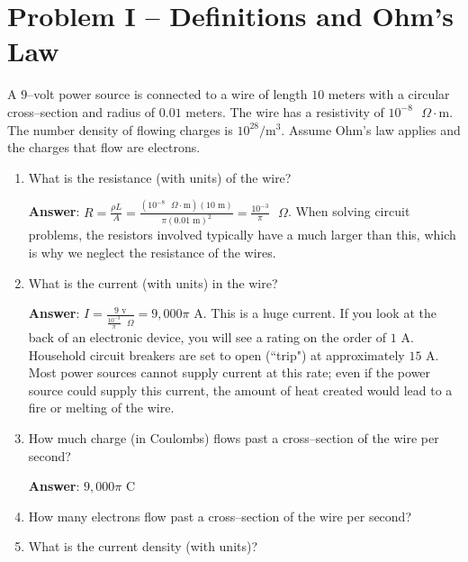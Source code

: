 \documentclass{article}
\newcommand{\ds}[0]{\displaystyle}
\begin{document}
\newpage

\section{Problem I -- Definitions and Ohm's Law}

A $9$--volt power source is connected to a wire of length $10$ meters with a circular cross--section and radius of $0.01$ meters. The wire has a resistivity of $10^{-8}\text{ }\Omega\cdot\text{m}$. The number density of flowing charges is $10^{28}/\text{m}^3$. Assume Ohm's law applies and the charges that flow are electrons.

\begin{enumerate}

  \item What is the resistance (with units) of the wire?

        \ifsolutions
        \textbf{Answer}: $\ds R=\frac{\rho L}{A} = \frac{(10^{-8}\text{ }\Omega\cdot\text{m})(10\text{ m})}{\pi (0.01\text{ m})^2} = \frac{10^{-3}}{\pi}\text{ }\Omega$. When solving circuit problems, the resistors involved typically have a much larger than this, which is why we neglect the resistance of the wires.
        \else
        \vskip 84pt
        \fi

  \item What is the current (with units) in the wire?

        \ifsolutions
        \textbf{Answer}: $\ds I = \frac{9\text{ v}}{\frac{10^{-3}}{\pi}\text{ }\Omega}=9,000\pi\text{ A}$. This is a huge current. If you look at the back of an electronic device, you will see a rating on the order of $1\text{ A}$. Household circuit breakers are set to open (``trip") at approximately $15\text{ A}$. Most power sources cannot supply current at this rate; even if the power source could supply this current, the amount of heat created would lead to a fire or melting of the wire.
        \else
        \vskip 84pt
        \fi

  \item How much charge (in Coulombs) flows past a cross--section of the wire per second?

        \ifsolutions
        \textbf{Answer}: $9,000\pi\text{ C}$
        \else
        \vskip 84pt
        \fi

  \item How many electrons flow past a cross--section of the wire per second?

  \item What is the current density (with units)?


\end{enumerate}
\end{document}
